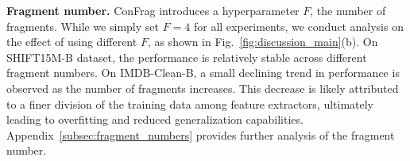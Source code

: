 \documentclass{article}
\theoremstyle{plain}
\theoremstyle{definition}
\theoremstyle{remark}
\begin{document}
\textbf{Fragment number.}
ConFrag introduces a hyperparameter $F$, the number of fragments.
While we simply set $F=4$ for all experiments, we conduct analysis on the effect of using different $F$, as shown in Fig.~\ref{fig:discussion_main}(b).
On SHIFT15M-B dataset, the performance is relatively stable across different fragment numbers.
On IMDB-Clean-B, a small declining trend in performance is observed as the number of fragments increases.
This decrease is likely attributed to a finer division of the training data among feature extractors, ultimately leading to overfitting and reduced generalization capabilities.
Appendix~\ref{subsec:fragment_numbers} provides further analysis of the fragment number.
\end{document}
